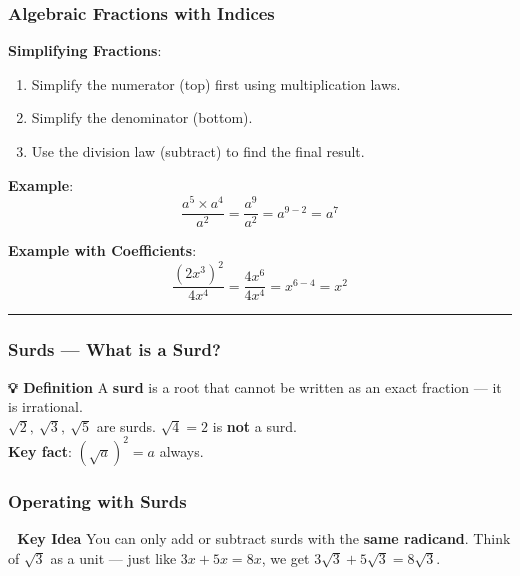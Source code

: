 \documentclass[
  letterpaper,
  DIV=11,
  numbers=noendperiod]{scrreprt}
\providecommand{\tightlist}{%
  \setlength{\itemsep}{0pt}\setlength{\parskip}{0pt}}
\theoremstyle{definition}
\theoremstyle{remark}
\begin{document}
\subsubsection*{Algebraic Fractions with
Indices}\label{algebraic-fractions-with-indices}

\textbf{Simplifying Fractions}:

\begin{enumerate}
\def\labelenumi{\arabic{enumi}.}
\tightlist
\item
  Simplify the numerator (top) first using multiplication laws.
\item
  Simplify the denominator (bottom).
\item
  Use the division law (subtract) to find the final result.
\end{enumerate}

\textbf{Example}:
\[\frac{a^5 \times a^4}{a^2} = \frac{a^{9}}{a^2} = a^{9-2} = a^7\]

\textbf{Example with Coefficients}:
\[\frac{(2x^3)^2}{4x^4} = \frac{4x^6}{4x^4} = x^{6-4} = x^2\]

\begin{center}\rule{0.5\linewidth}{0.5pt}\end{center}

\subsubsection*{Surds --- What is a Surd?}\label{surds-what-is-a-surd}

\textbf{💡 Definition} A \textbf{surd} is a root that cannot be written
as an exact fraction --- it is irrational.\\
\(\sqrt{2},\ \sqrt{3},\ \sqrt{5}\) are surds. \(\sqrt{4} = 2\) is
\textbf{not} a surd.\\
\textbf{Key fact}: \((\sqrt{a})^2 = a\) always.

\subsubsection*{Operating with Surds}\label{operating-with-surds}

\textbf{🎯 Key Idea} You can only add or subtract surds with the
\textbf{same radicand}. Think of \(\sqrt{3}\) as a unit --- just like
\(3x + 5x = 8x\), we get \(3\sqrt{3} + 5\sqrt{3} = 8\sqrt{3}\).
\end{document}
